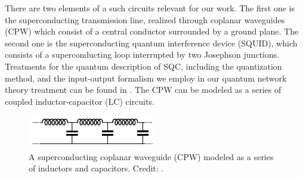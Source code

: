 There are two elements of a such circuits relevant for our work. The first one is the superconducting transmission line, realized through coplanar waveguides (CPW) which consist of a central conductor surrounded by a ground plane. The second one is the superconducting quantum interference device (SQUID), which consists of a superconducting loop interrupted by two Josephson junctions.
Treatments for the quantum description of SQC, including the quantization method, and the input-output formalism 
we employ in our quantum network theory treatment can be found in \cite{Yurke1984, Vool2017}. 
The CPW can be modeled as a series of coupled inductor-capacitor (LC) circuits. 

\begin{figure}[ht]
    \includegraphics[width=0.5\textwidth,keepaspectratio]{figures/intro/LC_Vool2017.png}
    \caption{A superconducting coplanar waveguide (CPW) modeled as a series of inductors and capacitors. Credit: \protect\cite{Vool2017}.}
    \label{fig:CPW_diagram}
\end{figure}

